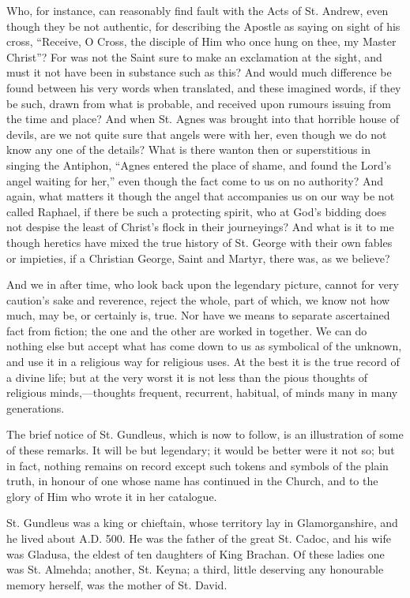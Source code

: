 Who, for instance, can reasonably find fault with
the Acts of St. Andrew, even though they be not authentic, for
describing the Apostle as saying on sight of his cross, ``Receive, O
Cross, the disciple of Him who once hung on thee, my Master Christ''?
For was not the Saint sure to make an exclamation at the sight, and
must it not have been in substance such as this? And would much
difference be found between his very words when translated, and these
imagined words, if they be such, drawn from what is probable, and
received upon rumours issuing from the time and place? And when St.
Agnes was brought into that horrible house of devils, are we not quite
sure that angels were with her, even though we do not know any one of
the details? What is there wanton then or superstitious in
singing the Antiphon, ``Agnes entered the place of shame, and found the
Lord's angel waiting for her,'' even though the fact come to us on no
authority? And again, what matters it though the angel that
accompanies us on our way be not called Raphael, if there be such a
protecting spirit, who at God's bidding does not despise the least of
Christ's flock in their journeyings? And what is it to me though
heretics have mixed the true history of St. George with their own
fables or impieties, if a Christian George, Saint and Martyr, there
was, as we believe?

And we in after time, who look back upon the
legendary picture, cannot for very caution's sake and reverence,
reject the whole, part of which, we know not how much, may be, or
certainly is, true. Nor have we means to separate ascertained fact
from fiction; the one and the other are worked in together. We can do
nothing else but accept what has come down to us as symbolical of the
unknown, and use it in a religious way for religious uses. At the best
it is the true record of a divine life; but at the very worst it is
not less than the pious thoughts of religious minds,—thoughts
frequent, recurrent, habitual, of minds many in many generations.

The brief notice of St. Gundleus, which is now to
follow, is an illustration of some of these remarks. It will be but
legendary; it would be better were it not so; but in fact, nothing
remains on record except such tokens and symbols of the plain truth,
in honour of one whose name has continued in the Church, and to the
glory of Him who wrote it in her catalogue.

St. Gundleus was a king or chieftain, whose
territory lay in Glamorganshire, and he lived about A.D.
500. He was the father of the great St. Cadoc, and his wife was
Gladusa, the eldest of ten daughters of King Brachan. Of these ladies
one was St. Almehda; another, St. Keyna; a third, little deserving any
honourable memory herself, was the mother of St. David.

